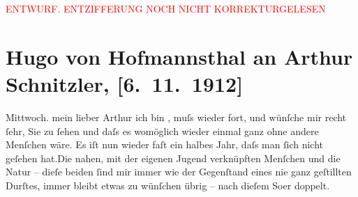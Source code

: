 
\begin{center}
            \textcolor{red}{ENTWURF. ENTZIFFERUNG NOCH NICHT KORREKTURGELESEN}
                      \end{center}
            
               \section[Hugo von Hofmannsthal an Arthur Schnitzler, {[}6. 11. 1912{]}]{ Hugo von Hofmannsthal an Arthur Schnitzler, {[}6. 11. 1912{]}}\nopagebreak{}\rehead{ }\begin{ledgroupsized}[t]{13cm}\normalsize\beginnumbering{} \toendnotes[C]{\smallbreak\pagebreak[2]} 
\toendnotes[C]{\smallbreak}\pstart
           \raggedleft{}{\pb}Mittwoch.\pend
           \pstart{}mein lieber Arthur\pend\pstart
           ich bin \label{K_L02093_1v}\label{K_L02093_1h}, muſs \label{K_L02093_2v}\label{K_L02093_2h} wieder fort,
               und wünſche mir recht ſehr, Sie zu ſehen und daſs es womöglich wieder einmal ganz
               ohne andere Menſchen wäre.\pend
           \pstart
           Es iſt nun wieder faſt ein halbes Jahr, daſs man ſich nicht geſehen hat.\hspace*{1.5em}Die nahen, mit der eigenen Jugend verknüpften Menſchen
               und die Natur – dieſe beiden ſind mir immer wie der Gegenſtand eines nie ganz
               geſtillten Durſtes, immer bleibt etwas zu wünſchen übrig – nach dieſem So{\geminationm}er doppelt.\pend

\end{ledgroupsized}
